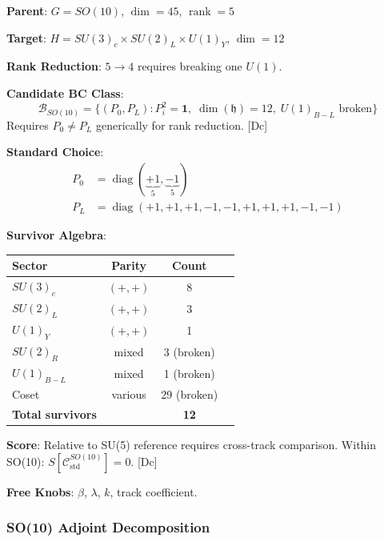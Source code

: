 \documentclass[11pt,a4paper]{article}
\newcommand{\tagDc}{\textcolor{blue!50!black}{[Dc]}}
\DeclareMathOperator{\diag}{diag}
\DeclareMathOperator{\rank}{rank}
\begin{document}
\begin{trackbox}[SO(10) BC Selection]
\textbf{Parent}: $G = SO(10)$, $\dim = 45$, $\rank = 5$

\textbf{Target}: $H = SU(3)_c \times SU(2)_L \times U(1)_Y$, $\dim = 12$

\textbf{Rank Reduction}: $5 \to 4$ requires breaking one $U(1)$.

\textbf{Candidate BC Class}:
\begin{equation}
\label{eq:so10-bc-class}
\mathcal{B}_{SO(10)} = \{(P_0, P_L) : P_i^2 = \mathbf{1},\; \dim(\mathfrak{h}) = 12,\; U(1)_{B-L} \text{ broken}\}
\end{equation}
Requires $P_0 \neq P_L$ generically for rank reduction. \tagDc

\textbf{Standard Choice}:
\begin{align}
\label{eq:so10-P0}
P_0 &= \diag(\underbrace{+1}_{5}, \underbrace{-1}_{5}) \\
\label{eq:so10-PL}
P_L &= \diag(+1,+1,+1,-1,-1,+1,+1,+1,-1,-1)
\end{align}

\textbf{Survivor Algebra}:
\begin{center}
\begin{tabular}{lccc}
\toprule
Sector & Parity & Count \\
\midrule
$SU(3)_c$ & $(+,+)$ & 8 \\
$SU(2)_L$ & $(+,+)$ & 3 \\
$U(1)_Y$ & $(+,+)$ & 1 \\
$SU(2)_R$ & mixed & 3 (broken) \\
$U(1)_{B-L}$ & mixed & 1 (broken) \\
Coset & various & 29 (broken) \\
\midrule
\textbf{Total survivors} & & \textbf{12} \\
\bottomrule
\end{tabular}
\end{center}

\textbf{Score}: Relative to SU(5) reference requires cross-track comparison.
Within SO(10): $S[\mathcal{C}_{\text{std}}^{SO(10)}] = 0$. \tagDc

\textbf{Free Knobs}: $\beta$, $\lambda$, $k$, track coefficient.
\end{trackbox}

\subsubsection{SO(10) Adjoint Decomposition}
\end{document}
